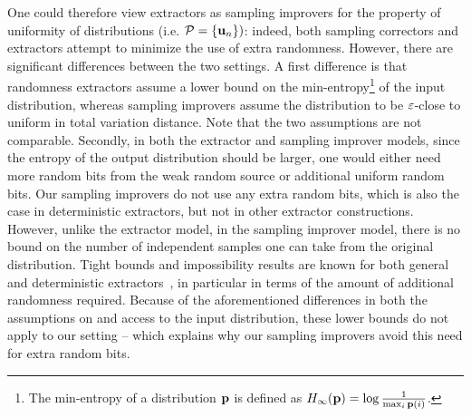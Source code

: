 One could therefore view extractors as sampling improvers
for the property of uniformity of distributions 
(i.e. $\mathcal{P}=\{\mathbf{u}_n\})$: 
indeed, both sampling correctors and extractors attempt to minimize the use of extra
randomness.
However, there are significant differences between the two settings.
A first difference is that randomness extractors assume a lower bound on the 
min-entropy\footnote{The min-entropy of a distribution 
$\mathbf{p}$ is defined as $H_{\infty}(\mathbf{p})=\log\frac{1}{\max_i{\mathbf{p}(i)}}$.} 
of the input distribution, whereas sampling improvers 
assume the distribution to be $\varepsilon$-close to uniform in total variation distance. 
Note that the two assumptions are not comparable.\footnotemark 
Secondly, in both the extractor and sampling improver
models, since the entropy of the output distribution should be larger, 
one would either need more random bits from the 
weak random source or additional uniform random bits. 
Our sampling improvers do not use any extra random bits, 
which is also the case in deterministic extractors, but not in other
extractor constructions.
However, unlike the extractor model, in the sampling improver model, 
there is no bound on the number of 
independent samples one can take from the original distribution. 
Tight bounds and impossibility results are known for both general and deterministic extractors~\cite{book:vadhan,RT:00}, 
in particular in terms of the amount of additional randomness required. 
Because of the aforementioned differences in both the assumptions on and access to the input distribution, 
these lower bounds do not apply to our setting -- which explains why our sampling improvers avoid this need for extra random bits.

